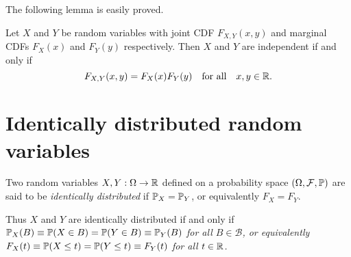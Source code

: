 
%

The following lemma is easily proved.
\begin{lemma}\label{lem:product_marginal_cdfs}
Let $X$ and $Y$ be random variables with joint CDF $F_{X,Y}(x,y)$ and marginal CDFs $F_X(x)$ and $F_Y(y)$ respectively. Then $X$ and $Y$ are independent if and only if
\[
F_{X,Y}(x,y) = F_X(x)F_Y(y) \text{\quad for all\quad} x,y\in\mathbb{R}.
\]
\end{lemma}


\section{Identically distributed random variables}
\begin{definition}
Two random variables $X,Y:\Omega\to\mathbb{R}$ defined on a probability space $(\Omega,\mathcal{F},\mathbb{P})$ are said to be \emph{identically distributed} if $\mathbb{P}_X = \mathbb{P}_Y$, or equivalently $F_X = F_Y$.
\end{definition}

Thus $X$ and $Y$ are identically distributed if and only if 
\bit
\it $\mathbb{P}_X(B) \equiv \mathbb{P}(X\in B) = \mathbb{P}(Y\in B) \equiv \mathbb{P}_Y(B)$ for all $B\in\mathcal{B}$, or equivalently
\it $F_X(t) \equiv \mathbb{P}(X\leq t) = \mathbb{P}(Y\leq t) \equiv F_Y(t)$ for all $t\in\mathbb{R}$.
\eit

